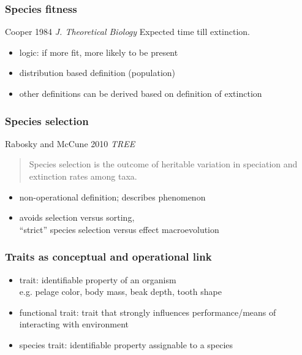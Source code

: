 \documentclass{beamer}
\begin{document}
\begin{frame}
  \frametitle{Species fitness}

  \begin{alertblock}{Cooper 1984 \em{J. Theoretical Biology}}
    Expected time till extinction.
  \end{alertblock}


  \begin{itemize}
    \item \alert{logic:} if more fit, more likely to be present
    \item distribution based definition (population)
    \item other definitions can be derived based on definition of extinction
  \end{itemize}
\end{frame}

\begin{frame}
  \frametitle{Species selection}

  \begin{alertblock}{Rabosky and McCune 2010 \em{TREE}}
    \begin{quote}
      Species selection is the outcome of heritable variation in speciation and extinction rates among taxa.
    \end{quote}
  \end{alertblock}

  \begin{itemize}
    \item non-operational definition; describes phenomenon
    \item avoids selection versus sorting, \\``strict'' species selection versus effect macroevolution
  \end{itemize}
\end{frame}

\begin{frame}
  \frametitle{Traits as conceptual and operational link}

  \begin{definition}
    \begin{itemize}
      \item \alert{trait}: identifiable property of an organism \\e.g. pelage color, body mass, beak depth, tooth shape
      \item \alert{functional trait}: trait that strongly influences performance/means of interacting with environment
      \item \alert{species trait}: identifiable property assignable to a species
    \end{itemize}
  \end{definition}
\end{frame}
\end{document}
